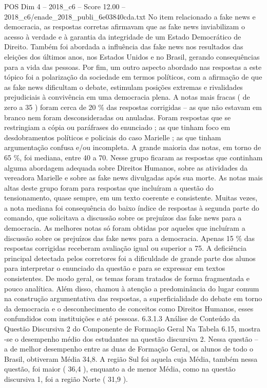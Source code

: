 \begin{textsample}{POS Dim 4 – 2018\_c6 – Score 12.00 – 2018\_c6/enade\_2018\_publi\_6e03840cda.txt}
No item relacionado a fake news e democracia, as respostas corretas afirmavam que as fake news inviabilizam o acesso à verdade e à garantia da integridade de um Estado Democrático de Direito.
Também foi abordada a influência das fake news nos resultados das eleições dos últimos anos, nos Estados Unidos e no Brasil, gerando consequências para a vida das pessoas.
Por fim, um outro aspecto abordado nas respostas a este tópico foi a polarização da sociedade em termos políticos, com a afirmação de que as fake news dificultam o debate, estimulam posições extremas e rivalidades prejudiciais à convivência em uma democracia plena.
A notas mais fracas ( de zero a 35 ) foram cerca de 20 \% das respostas corrigidas – as que não estavam em branco nem foram desconsideradas ou anuladas.
Foram respostas que se restringiam a cópia ou paráfrases do enunciado ; as que tinham foco em desdobramentos políticos e policiais do caso Marielle ; as que tinham argumentação confusa e/ou incompleta.
A grande maioria das notas, em torno de 65 \%, foi mediana, entre 40 a 70.
Nesse grupo ficaram as respostas que continham alguma abordagem adequada sobre Direitos Humanos, sobre as atividades da vereadora Marielle e sobre as fake news divulgadas após sua morte.
As notas mais altas deste grupo foram para respostas que incluíram a questão do tensionamento, quase sempre, em um texto coerente e consistente.
Muitas vezes, a nota mediana foi consequência do baixo índice de respostas à segunda parte do comando, que solicitava a discussão sobre os prejuízos das fake news para a democracia.
As melhores notas só foram obtidas por aqueles que incluíram a discussão sobre os prejuízos das fake news para a democracia.
Apenas 15 \% das respostas corrigidas receberam avaliação igual ou superior a 75.
A deficiência principal detectada pelos corretores foi a dificuldade de grande parte dos alunos para interpretar o enunciado da questão e para se expressar em textos consistentes.
De modo geral, os temas foram tratados de forma fragmentada e pouco analítica.
Além disso, chamou à atenção a predominância do lugar comum na construção argumentativa das respostas, a superficialidade do debate em torno da democracia e o desconhecimento de conceitos como Direitos Humanos, esses confundidos com instituições e até pessoas. 6.3.1.3 Análise de Conteúdo da Questão Discursiva 2 do Componente de Formação Geral Na Tabela 6.15, mostra -se o desempenho médio dos estudantes na questão discursiva 2.
Nessa questão – a de melhor desempenho entre as duas de Formação Geral, os alunos de todo o Brasil, obtiveram Média 34,8.
A região Sul foi aquela cuja Média, também nessa questão, foi maior ( 36,4 ), enquanto a de menor Média, como na questão discursiva 1, foi a região Norte ( 31,9 ).

\end{textsample}
